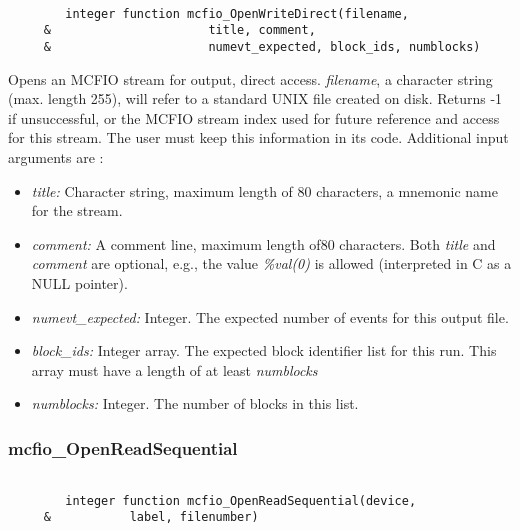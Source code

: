 \begin{verbatim}

        integer function mcfio_OpenWriteDirect(filename, 
     &                      title, comment,
     &                      numevt_expected, block_ids, numblocks)

\end{verbatim}
 Opens an MCFIO stream for output, direct access. {\em filename}, a  character
 string (max. length 255), will refer to a  standard UNIX file created on
 disk. Returns -1 if unsuccessful, or the MCFIO stream index 
 used for future reference and access for this stream. The user must keep
 this information in its code. Additional input arguments are : 
\begin{itemize}
\item {\em title:} Character string, maximum length of 80 characters, a mnemonic name for the 
stream.
\item {\em comment:} A comment line, maximum length of80 characters. Both {\em title }
and {\em comment} are optional, e.g., the value {\em \%val(0)} is allowed
(interpreted in C as a NULL pointer).
\item {\em numevt\_expected:} Integer.  The expected number of events for this
output  file.
\item {\em block\_ids:} Integer array. The expected block identifier list for 
this run. This array must have a length of at least {\em numblocks}
\item {\em numblocks:} Integer. The number of blocks in this list.
\end{itemize}

 
\subsubsection{mcfio\_OpenReadSequential}

\begin{verbatim}

        integer function mcfio_OpenReadSequential(device,
     &           label, filenumber)

\end{verbatim}

